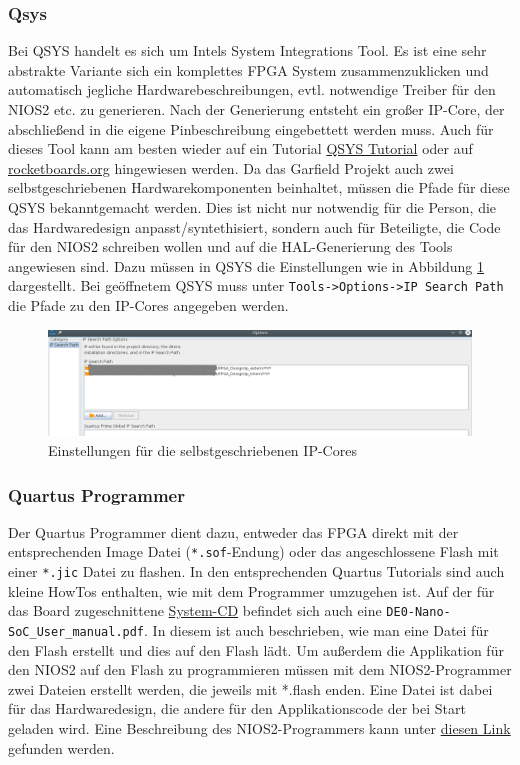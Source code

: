 \subsubsection{Qsys}
Bei QSYS handelt es sich um Intels System Integrations Tool. Es ist eine sehr abstrakte Variante sich ein komplettes \ac{FPGA} System zusammenzuklicken und automatisch jegliche Hardwarebeschreibungen, evtl. notwendige Treiber für den NIOS2 etc. zu generieren. Nach der Generierung entsteht ein großer IP-Core, der abschließend in die eigene Pinbeschreibung eingebettett werden muss. Auch für dieses Tool kann am besten wieder auf ein Tutorial \href{https://www.altera.com/content/dam/altera-www/global/en_US/pdfs/literature/tt/tt_qsys_intro.pdf}{QSYS Tutorial} oder auf \href{rocketboards.org}{rocketboards.org} hingewiesen werden.
Da das Garfield Projekt auch zwei selbstgeschriebenen Hardwarekomponenten beinhaltet, müssen die Pfade für diese QSYS bekanntgemacht werden. Dies ist nicht nur notwendig für die Person, die das Hardwaredesign anpasst/syntethisiert, sondern auch für Beteiligte, die Code für den NIOS2 schreiben wollen und auf die \ac{HAL}-Generierung des Tools angewiesen sind. Dazu müssen in QSYS die Einstellungen wie in Abbildung \ref{Settings:IP} dargestellt. Bei geöffnetem QSYS muss unter \texttt{Tools->Options->IP Search Path} die Pfade zu den \ac{IP}-Cores angegeben werden.

\begin{figure}
	\includegraphics[width=\textwidth]{Abb/Qsys_settings.png}
	\caption{Einstellungen für die selbstgeschriebenen \ac{IP}-Cores}
	\label{Settings:IP}
\end{figure}

\subsubsection{Quartus Programmer}
Der Quartus Programmer dient dazu, entweder das \ac{FPGA} direkt mit der entsprechenden Image Datei (\texttt{*.sof}-Endung) oder das angeschlossene Flash mit einer \texttt{*.jic} Datei zu flashen. In den entsprechenden Quartus Tutorials sind auch kleine HowTos enthalten, wie mit dem Programmer umzugehen ist. Auf der für das Board zugeschnittene \href{http://www.terasic.com/downloads/cd-rom/de0-nano-soc/}{System-CD} befindet sich auch eine \texttt{DE0-Nano-SoC\_User\_manual.pdf}. In diesem ist auch beschrieben, wie man eine Datei für den Flash erstellt und dies auf den Flash lädt. Um außerdem die Applikation für den NIOS2 auf den Flash zu programmieren müssen mit dem NIOS2-Programmer zwei Dateien erstellt werden, die jeweils mit *.flash enden. Eine Datei ist dabei für das Hardwaredesign, die andere für den Applikationscode der bei Start geladen wird. Eine Beschreibung des NIOS2-Programmers kann unter \href{https://www.altera.com/content/dam/altera-www/global/en_US/pdfs/literature/ug/ug_nios2_flash_programmer.pdf}{diesen Link} gefunden werden. 

